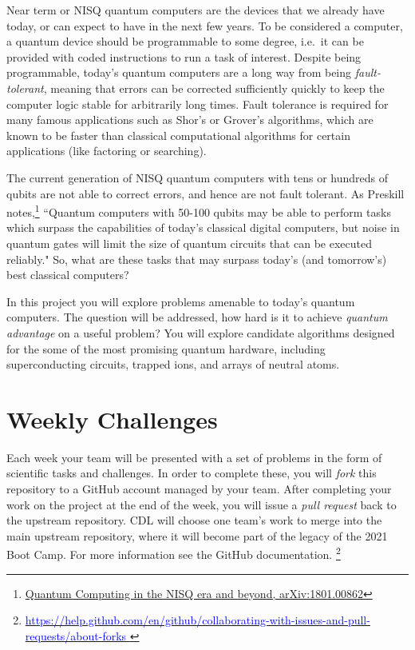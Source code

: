\documentclass[12pt]{article}
\begin{document}
Near term or NISQ quantum computers are the devices that we already have today, or can expect to have in the next few years.
To be considered a computer, a quantum device should be programmable to some degree, 
i.e.~it can be provided with coded instructions to run a task of interest.
Despite being programmable, today's quantum computers are a long way from being {\it fault-tolerant}, meaning that errors can be corrected sufficiently
quickly to keep the computer logic stable for arbitrarily long times.  Fault tolerance is required for many famous applications such as 
Shor's or Grover's algorithms, which are known to be faster than classical computational algorithms for certain applications
(like factoring or searching).

The current generation of NISQ quantum computers with tens or hundreds of qubits are not able to correct errors, and hence are not fault tolerant.
As Preskill notes,\footnote{\href{https://arxiv.org/abs/1801.00862}{Quantum Computing in the NISQ era and beyond, arXiv:1801.00862}}
``Quantum computers with 50-100 qubits may 
be able to perform tasks which surpass the capabilities of today's classical digital computers, but noise in quantum gates 
will limit the size of quantum circuits that can be executed reliably."  So, what are these tasks that may surpass today's (and tomorrow's)
best classical computers?  

In this project you will explore problems amenable to today's quantum computers.  The question will be addressed, 
how hard is it to achieve {\it quantum advantage} on a useful problem?
You will explore candidate algorithms designed for the some of the most promising quantum
hardware, including superconducting circuits, trapped ions, and arrays of neutral atoms.


\section{Weekly Challenges}

Each week your team will be presented with a set of problems in the form of scientific tasks and challenges.  In order to complete these, you will {\it fork} this repository to a GitHub account managed by your team.  After completing your work on the project at the end of the week, you will issue a {\it pull request} back to the upstream repository.
CDL will choose one team's work to merge into the main upstream repository, where it will become part of the legacy of the 2021 Boot Camp.  For more information see the
GitHub documentation.
\footnote{
    \href{https://help.github.com/en/github/collaborating-with-issues-and-pull-requests/about-forks}{\textcolor{blue}{https://help.github.com/en/github/collaborating-with-issues-and-pull-requests/about-forks} } }
\end{document}
